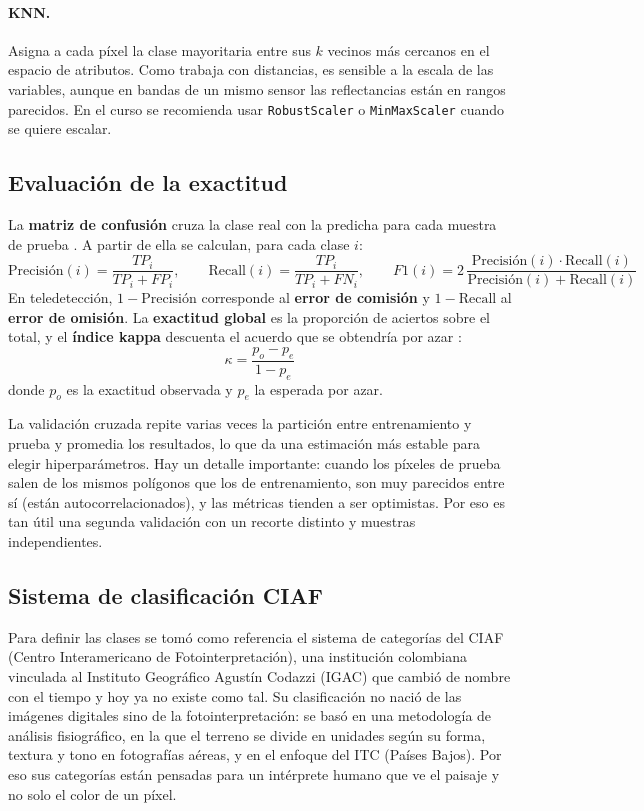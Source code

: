 \documentclass[11pt,letterpaper]{article}
\begin{document}
\paragraph{KNN.} Asigna a cada píxel la clase mayoritaria entre sus $k$ vecinos más cercanos en el espacio de
atributos. Como trabaja con distancias, es sensible a la escala de las variables, aunque en bandas de un
mismo sensor las reflectancias están en rangos parecidos. En el curso se recomienda usar
\texttt{RobustScaler} o \texttt{MinMaxScaler} cuando se quiere escalar.

\subsection{Evaluación de la exactitud}
La \textbf{matriz de confusión} cruza la clase real con la predicha para cada muestra de prueba
\citep{congalton1991}. A partir de ella se calculan, para cada clase $i$:
\begin{equation}
\text{Precisión}(i)=\frac{TP_i}{TP_i+FP_i},\qquad
\text{Recall}(i)=\frac{TP_i}{TP_i+FN_i},\qquad
F1(i)=2\,\frac{\text{Precisión}(i)\cdot\text{Recall}(i)}{\text{Precisión}(i)+\text{Recall}(i)}
\end{equation}
En teledetección, $1-\text{Precisión}$ corresponde al \textbf{error de comisión} y $1-\text{Recall}$ al
\textbf{error de omisión}. La \textbf{exactitud global} es la proporción de aciertos sobre el total, y el
\textbf{índice kappa} descuenta el acuerdo que se obtendría por azar \citep{cohen1960}:
\begin{equation}
\kappa=\frac{p_o-p_e}{1-p_e}
\end{equation}
donde $p_o$ es la exactitud observada y $p_e$ la esperada por azar.

La validación cruzada repite varias veces la partición entre entrenamiento y prueba y promedia los
resultados, lo que da una estimación más estable para elegir hiperparámetros. Hay un detalle importante:
cuando los píxeles de prueba salen de los mismos polígonos que los de entrenamiento, son muy parecidos entre
sí (están autocorrelacionados), y las métricas tienden a ser optimistas. Por eso es tan útil una segunda
validación con un recorte distinto y muestras independientes.

\subsection{Sistema de clasificación CIAF}

Para definir las clases se tomó como referencia el sistema de categorías del CIAF (Centro Interamericano de Fotointerpretación), una institución colombiana vinculada al Instituto Geográfico Agustín Codazzi (IGAC) que cambió de nombre con el tiempo y hoy ya no existe como tal. Su clasificación no nació de las imágenes digitales sino de la fotointerpretación: se basó en una metodología de análisis fisiográfico, en la que el terreno se divide en unidades según su forma, textura y tono en fotografías aéreas, y en el enfoque del ITC (Países Bajos). Por eso sus categorías están pensadas para un intérprete humano que ve el paisaje y no solo el color de un píxel.
\end{document}

